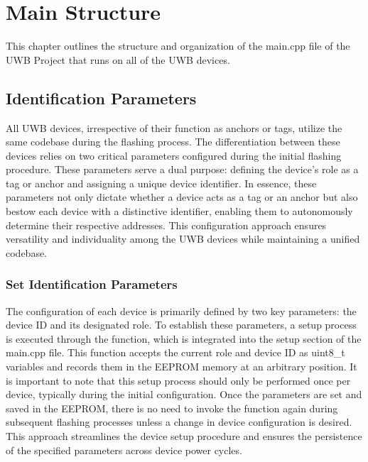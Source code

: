 \chapter{Main Structure}
This chapter outlines the structure and organization of the main.cpp file of the UWB Project that runs on all of the UWB devices.

\section{Identification Parameters}
All UWB devices, irrespective of their function as anchors or tags, utilize the same codebase during the flashing process. 
The differentiation between these devices relies on two critical parameters configured during the initial flashing procedure. 
These parameters serve a dual purpose: defining the device's role as a tag or anchor and assigning a unique device identifier.
\vspace{4pt}
\newline
In essence, these parameters not only dictate whether a device acts as a tag or an anchor but also bestow each device with a distinctive identifier, enabling them to autonomously determine their respective addresses. 
This configuration approach ensures versatility and individuality among the UWB devices while maintaining a unified codebase.

\subsection{Set Identification Parameters}
The configuration of each device is primarily defined by two key parameters: the device ID and its designated role. 
To establish these parameters, a setup process is executed through the  function, which is integrated into the setup section of the main.cpp file. 
This function accepts the current role and device ID as uint8\_t variables and records them in the EEPROM memory at an arbitrary position.
\vspace{4pt}
\newline
It is important to note that this setup process should only be performed once per device, typically during the initial configuration. 
Once the parameters are set and saved in the EEPROM, there is no need to invoke the  function again during subsequent flashing processes unless a change in device configuration is desired. 
This approach streamlines the device setup procedure and ensures the persistence of the specified parameters across device power cycles.

